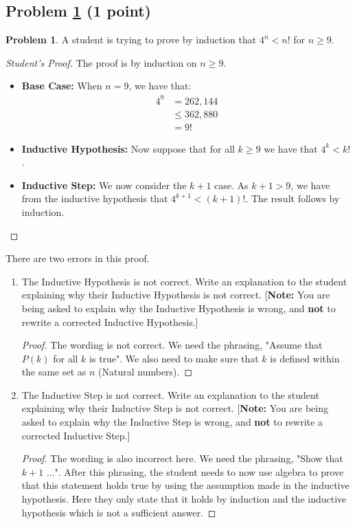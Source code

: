 \documentclass[11pt]{article}
\theoremstyle{definition}
\theoremstyle{definition}
\newtheorem{required}{Problem}
\theoremstyle{definition}
\begin{document}
\subsection{Problem \ref{Induction1} (1 point)}
\begin{required} \label{Induction1}
A student is trying to prove by induction that $4^{n} < n!$ for $n \geq 9$. 

\begin{proof}[Student's Proof]
The proof is by induction on $n \geq 9$. 
\begin{itemize}
\item \textbf{Base Case:} When $n = 9$, we have that:
\begin{align*}
4^{9} &= 262,144 \\
&\leq 362,880 \\
&= 9!
\end{align*}

\item \textbf{Inductive Hypothesis:} Now suppose that for all $k \geq 9$ we have that $4^{k} < k!$. 

\item \textbf{Inductive Step:} We now consider the $k+1$ case. As $k+1 > 9$, we have from the inductive hypothesis that $4^{k+1} < (k+1)!$. The result follows by induction.
\end{itemize}
\end{proof}

There are two errors in this proof. 
\begin{enumerate}[label=(\alph*)]
\item The Inductive Hypothesis is not correct. Write an explanation to the student explaining why their Inductive Hypothesis is not correct. [\textbf{Note:} You are being asked to explain why the Inductive Hypothesis is wrong, and \textbf{not} to rewrite a corrected Inductive Hypothesis.]


\begin{proof}
The wording is not correct. We need the phrasing, "Assume that $P(k)$ for all $k$ is true". We also need to make sure that $k$ is defined within the same set as $n$ (Natural numbers).
\end{proof}



\vskip 15pt
\item The Inductive Step is not correct. Write an explanation to the student explaining why their Inductive Step is not correct. [\textbf{Note:} You are being asked to explain why the Inductive Step is wrong, and \textbf{not} to rewrite a corrected Inductive Step.]

\begin{proof}
The wording is also incorrect here. We need the phrasing, "Show that $k + 1$ ...". After this phrasing, the student needs to now use algebra to prove that this statement holds true by using the assumption made in the inductive hypothesis. Here they only state that it holds by induction and the inductive hypothesis which is not a sufficient answer.
\end{proof}
\end{enumerate}
\end{required}
\end{document}
